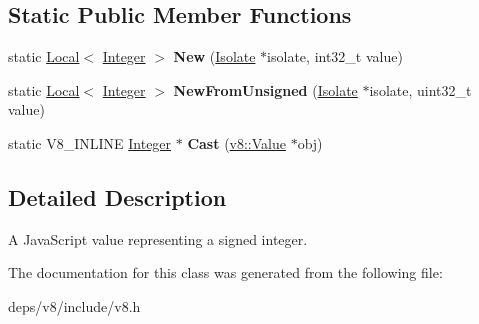 \subsection*{Static Public Member Functions}
\begin{DoxyCompactItemize}
\item 
\hypertarget{classv8_1_1_integer_a730d6e093c16d95edb5b92a4d05773d0}{}static \hyperlink{classv8_1_1_local}{Local}$<$ \hyperlink{classv8_1_1_integer}{Integer} $>$ {\bfseries New} (\hyperlink{classv8_1_1_isolate}{Isolate} $\ast$isolate, int32\+\_\+t value)\label{classv8_1_1_integer_a730d6e093c16d95edb5b92a4d05773d0}

\item 
\hypertarget{classv8_1_1_integer_a6fbd6e79db802c737cb0bd5a259f134b}{}static \hyperlink{classv8_1_1_local}{Local}$<$ \hyperlink{classv8_1_1_integer}{Integer} $>$ {\bfseries New\+From\+Unsigned} (\hyperlink{classv8_1_1_isolate}{Isolate} $\ast$isolate, uint32\+\_\+t value)\label{classv8_1_1_integer_a6fbd6e79db802c737cb0bd5a259f134b}

\item 
\hypertarget{classv8_1_1_integer_a886f73d3d8bb91f8235f66d8dccec12a}{}static V8\+\_\+\+I\+N\+L\+I\+N\+E \hyperlink{classv8_1_1_integer}{Integer} $\ast$ {\bfseries Cast} (\hyperlink{classv8_1_1_value}{v8\+::\+Value} $\ast$obj)\label{classv8_1_1_integer_a886f73d3d8bb91f8235f66d8dccec12a}

\end{DoxyCompactItemize}


\subsection{Detailed Description}
A Java\+Script value representing a signed integer. 

The documentation for this class was generated from the following file\+:\begin{DoxyCompactItemize}
\item 
deps/v8/include/v8.\+h\end{DoxyCompactItemize}
